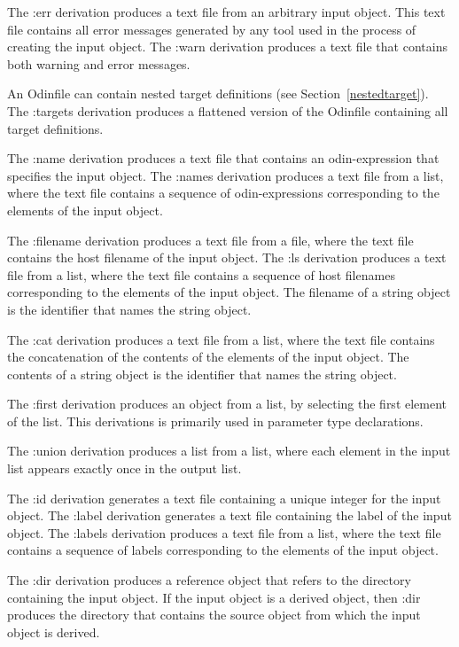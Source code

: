 The {\ex :err} derivation produces a text file from an arbitrary input object.
This text file contains all error messages generated by any tool
used in the process of creating the input object.
The {\ex :warn} derivation produces a text file
that contains both warning and error messages.

An {\ex Odinfile} can contain nested target definitions
(see Section~\ref{nestedtarget}).
The {\ex :targets} derivation produces a flattened version
of the {\ex Odinfile} containing all target definitions.

The {\ex :name} derivation produces a text file that contains an
odin-expression that specifies the input object.
The {\ex :names} derivation produces a text file from a list,
where the text file contains a sequence of odin-expressions
corresponding to the elements of the input object.

The {\ex :filename} derivation produces a text file from a file,
where the text file contains the host filename of the input object.
The {\ex :ls} derivation produces a text file from a list,
where the text file contains a sequence of host filenames
corresponding to the elements of the input object.
The filename of a string object is the identifier that names the string object.

The {\ex :cat} derivation produces a text file from a list,
where the text file contains the concatenation of the contents
of the elements of the input object.
The contents of a string object is the identifier that names the string object.

The {\ex :first} derivation produces an object from a list,
by selecting the first element of the list.
This derivations is primarily used in parameter type declarations.

The {\ex :union} derivation produces a list from a list,
where each element in the input list appears exactly once in the output list.

The {\ex :id} derivation generates a text file containing a unique
integer for the input object.
The {\ex :label} derivation generates a text file containing
the label of the input object.
The {\ex :labels} derivation produces a text file from a list,
where the text file contains a sequence of labels corresponding to
the elements of the input object.

The {\ex :dir} derivation produces a reference object that refers to
the directory containing the input object.
If the input object is a derived object,
then {\ex :dir} produces the directory that contains
the source object from which the input object is derived.

